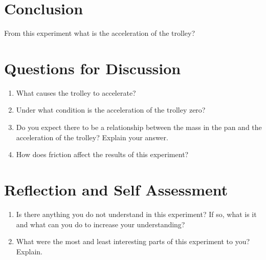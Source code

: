 \section{Conclusion}
From this experiment what is the acceleration of the trolley?

\section{Questions for Discussion}
\begin{enumerate}
\item What causes the trolley to accelerate?
\item Under what condition is the acceleration of the trolley zero?
\item Do you expect there to be a relationship between the mass in the pan and the acceleration of the trolley? Explain your answer.
\item How does friction affect the results of this experiment?
\end{enumerate}

\section{Reflection and Self Assessment}
\begin{enumerate}
\item Is there anything you do not understand in this experiment? If so, what is it and what can you do to increase your understanding?
\item What were the most and least interesting parts of this experiment to you? Explain.

\end{enumerate}
